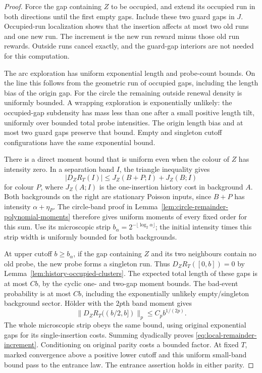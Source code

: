 \documentclass[11pt,letterpaper]{article}
\begin{document}
\begin{proof}
Force the gap containing $Z$ to be occupied, and extend its
occupied run in both directions until the first empty gaps.
Include these two guard gaps in $J$. Occupied-run localization
shows that the insertion affects at most two old runs and one
new run. The increment is the new run reward minus those old
run rewards. Outside runs cancel exactly, and the guard-gap
interiors are not needed for this computation.

The arc exploration has uniform exponential length and probe-count
bounds. On the line this follows from the geometric run of
occupied gaps, including the length bias of the origin gap.
For the circle the remaining outside renewal density is
uniformly bounded. A wrapping exploration is exponentially
unlikely: the occupied-gap subdensity has mass less than one
after a small positive length tilt, uniformly over bounded
total probe intensities. The origin length bias and at most
two guard gaps preserve that bound. Empty and singleton
cutoff configurations have the same exponential bound.

There is a direct moment bound that is uniform even when the
colour of $Z$ has intensity zero. In a separation band $I$,
the triangle inequality gives
\[
 |D_ZR_T(I)|\le J_Z(B+P;I)+J_Z(B;I)
\]
for colour $P$, where $J_Z(A;I)$ is the one-insertion history
cost in background $A$. Both backgrounds on the right are
stationary Poisson inputs, since $B+P$ has intensity
$\alpha+\eta_P$. The circle-band proof in
Lemma~\ref{lem:circle-remainder-polynomial-moments} therefore
gives uniform moments of every fixed order for this sum.
Use its microscopic strip
$b_\alpha=2^{-\lfloor\log_2\alpha\rfloor}$; the initial
intensity times this strip width is uniformly bounded for
both backgrounds.

At upper cutoff $b\ge b_\alpha$, if the gap containing $Z$
and its two neighbours contain no old probe, the new probe
forms a singleton run. Thus $D_ZR_T([0,b])=0$ by
Lemma~\ref{lem:history-occupied-clusters}. The expected total
length of these gaps is at most $Cb$, by the cyclic one- and
two-gap moment bounds. The bad-event probability is at most
$Cb$, including the exponentially unlikely empty/singleton
background sector. H\"older with the $2p$th band moment gives
\[
 \|D_ZR_T((b/2,b])\|_p\le C_pb^{1/(2p)}.
\]
The whole microscopic strip obeys the same bound, using
original exponential gaps for its single-insertion costs.
Summing dyadically proves \eqref{eq:local-remainder-increment}.
Conditioning on original parity costs a bounded factor.
At fixed $T$, marked convergence above a positive lower cutoff
and this uniform small-band bound pass to the entrance law.
The entrance assertion holds in either parity.
\end{proof}
\end{document}
